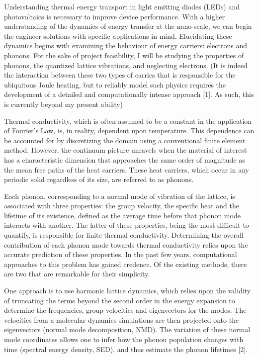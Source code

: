 \documentclass{article}
\begin{document}
Understanding thermal energy transport in light emitting diodes (LEDs) and photovoltaics is necessary to improve device performance. With a higher understanding of the dynamics of energy transfer at the nano-scale, we can begin the engineer solutions with specific applications in mind. Elucidating these dynamics begins with examining the behaviour of energy carriers: electrons and phonons. For the sake of project feasibility, I will be studying the properties of phonons, the quantized lattice vibrations, and neglecting electrons. (It is indeed the interaction between these two types of carries that is responsible for the ubiquitous Joule heating, but to reliably model such physics requires the development of a  detailed and computationally intense approach [1]. As such, this is currently beyond my present ability)

Thermal conductivity, which is often assumed to be a constant in the application of Fourier's Law, is, in reality, dependent upon temperature. This dependence can be accounted for by discretizing the domain using a conventional finite element method. However, the continuum picture unravels when the material of interest has a characteristic dimension that approaches the same order of magnitude as the mean free paths of the heat carriers. These heat carriers, which occur in any periodic solid regardless of its size, are referred to as phonons.

Each phonon, corresponding to a normal mode of vibration of the lattice, is associated with three properties: the group velocity, the specific heat and the lifetime of its existence, defined as the average time before that phonon mode interacts with another. The latter of these properties, being the most difficult to quantify, is responsible for finite thermal conductivity. Determining the overall contribution of each phonon mode towards thermal conductivity relies upon the accurate prediction of these properties. In the past few years, computational approaches to this problem has gained credence. Of the existing methods, there are two that are remarkable for their simplicity.

One approach is to use harmonic lattice dynamics, which relies upon the validity of truncating the terms beyond the second order in the energy expansion to determine the frequencies, group velocities and eigenvectors for the modes. The velocities from a molecular dynamics simulations are then projected onto the eigenvectors (normal mode decomposition, NMD). The variation of these normal mode coordinates allows one to infer how the phonon population changes with time (spectral energy density, SED), and thus estimate the phonon lifetimes [2].
\end{document}
